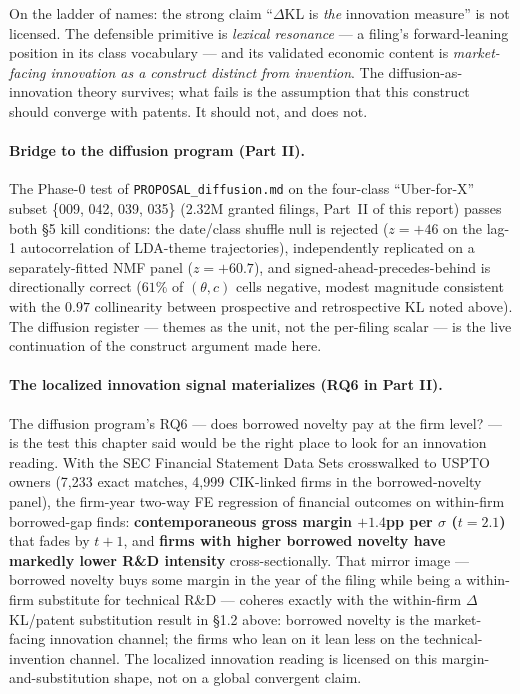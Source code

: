 \documentclass[11pt]{report}
\newcommand{\dkl}{$\Delta$KL}
\begin{document}
\noindent On the ladder of names: the strong claim ``\dkl{} is \emph{the}
innovation measure'' is not licensed. The defensible primitive is \emph{lexical
resonance} --- a filing's forward-leaning position in its class vocabulary --- and
its validated economic content is \emph{market-facing innovation as a construct
distinct from invention}. The diffusion-as-innovation theory survives; what fails
is the assumption that this construct should converge with patents. It should
not, and does not.

\paragraph{Bridge to the diffusion program (Part II).} The Phase-0 test of
\texttt{PROPOSAL\_diffusion.md} on the four-class ``Uber-for-X'' subset
\{009, 042, 039, 035\} (2.32M granted filings, Part~II of this report) passes
both §5 kill conditions: the date/class shuffle null is rejected ($z=+46$ on
the lag-1 autocorrelation of LDA-theme trajectories), independently replicated
on a separately-fitted NMF panel ($z=+60.7$), and signed-ahead-precedes-behind
is directionally correct ($61\%$ of $(\theta, c)$ cells negative, modest
magnitude consistent with the $0.97$ collinearity between prospective and
retrospective KL noted above). The diffusion register --- themes as the unit,
not the per-filing scalar --- is the live continuation of the construct argument
made here.

\paragraph{The localized innovation signal materializes (RQ6 in Part II).}
The diffusion program's RQ6 --- does borrowed novelty pay at the firm level? ---
is the test this chapter said would be the right place to look for an
innovation reading. With the SEC Financial Statement Data Sets crosswalked to
USPTO owners (7{,}233 exact matches, 4{,}999 CIK-linked firms in the
borrowed-novelty panel), the firm-year two-way FE regression of financial
outcomes on within-firm borrowed-gap finds: \textbf{contemporaneous gross margin
$+1.4$pp per $\sigma$ ($t=2.1$)} that fades by $t+1$, and \textbf{firms with
higher borrowed novelty have markedly lower R\&D intensity} cross-sectionally.
That mirror image --- borrowed novelty buys some margin in the year of the
filing while being a within-firm substitute for technical R\&D --- coheres
exactly with the within-firm $\Delta$KL/patent substitution result in §1.2 above:
borrowed novelty is the market-facing innovation channel; the firms who lean
on it lean less on the technical-invention channel. The localized innovation
reading is licensed on this margin-and-substitution shape, not on a global
convergent claim.
\end{document}
